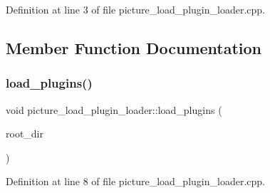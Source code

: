Definition at line 3 of file picture\+\_\+load\+\_\+plugin\+\_\+loader.\+cpp.



\subsection{Member Function Documentation}
\mbox{\label{classpicture__load__plugin__loader_a0e59be47c219103db204896cb89f0720}} 
\subsubsection{\texorpdfstring{load\+\_\+plugins()}{load\_plugins()}}
{\footnotesize\ttfamily void picture\+\_\+load\+\_\+plugin\+\_\+loader\+::load\+\_\+plugins (\begin{DoxyParamCaption}\item[{Q\+Dir}]{root\+\_\+dir }\end{DoxyParamCaption})}



Definition at line 8 of file picture\+\_\+load\+\_\+plugin\+\_\+loader.\+cpp.

